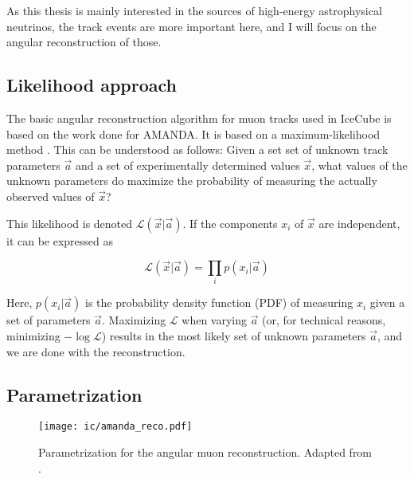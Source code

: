 As this thesis is mainly interested in the sources of high-energy astrophysical neutrinos, the track events are more important here, and I will focus on the angular reconstruction of those.

\subsection{Likelihood approach}
The basic angular reconstruction algorithm for muon tracks used in IceCube is based on the work done for AMANDA. It is based on a maximum-likelihood method . This can be understood as follows: Given a set set of unknown track parameters $\vec{a}$ and a set of experimentally determined values $\vec{x}$, what values of the unknown parameters do maximize the probability of measuring the actually observed values of $\vec{x}$?

This likelihood is denoted $\mathcal{L}(\vec{x}|\vec{a})$. If the components $x_i$ of $\vec{x}$ are independent, it can be expressed as

\begin{equation}
\mathcal{L}(\vec{x}|\vec{a}) = \prod_i p(x_i|\vec{a})
\end{equation}

Here, $p(x_i|\vec{a})$ is the probability density function (PDF) of measuring $x_i$ given a set of parameters $\vec{a}$. Maximizing $\mathcal{L}$ when varying $\vec{a}$ (or, for technical reasons, minimizing $-\log{\mathcal{L}}$) results in the most likely set of unknown parameters $\vec{a}$, and we are done with the reconstruction.

\subsection{Parametrization}
\begin{figure}[h!]
    \texttt{[image: ic/amanda\_reco.pdf]}
    \caption[Angular reconstruction in IceCube]{Parametrization for the angular muon reconstruction. Adapted from \cite{Ahrens2004}.}
\end{figure}

